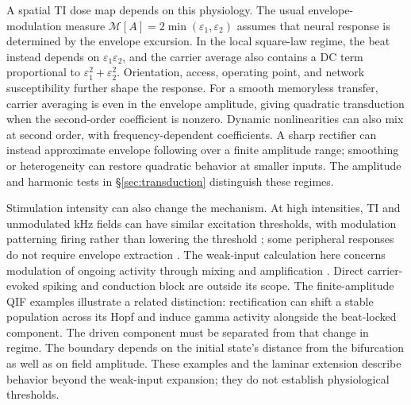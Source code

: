 \documentclass[11pt,a4paper]{article}
\providecommand{\DIFaddend}{} %
\begin{document}
\DIFaddend A spatial TI dose map depends on this physiology. The usual envelope-modulation
measure $\mathcal M[A]=2\min(\varepsilon_1,\varepsilon_2)$ assumes that neural
response is determined by the envelope excursion. In the local square-law regime,
the beat instead depends on $\varepsilon_1\varepsilon_2$, and the carrier average
also contains a DC term proportional to $\varepsilon_1^2+\varepsilon_2^2$.
Orientation, access, operating point, and network susceptibility further shape
the response. For a smooth memoryless transfer, carrier averaging is even in the
envelope amplitude, giving quadratic transduction when the second-order coefficient
is nonzero. Dynamic nonlinearities can also mix at second order, with
frequency-dependent coefficients. A sharp rectifier can instead approximate
envelope following over a finite amplitude range; smoothing or heterogeneity
can restore quadratic behavior at smaller inputs. The amplitude and harmonic
tests in \S\ref{sec:transduction} distinguish these regimes.

Stimulation intensity can also change the mechanism. At high intensities, TI and
unmodulated kHz fields can have similar excitation thresholds, with modulation
patterning firing rather than lowering the threshold
\cite{opancar2025,semenov2025}; some peripheral responses do not require envelope
extraction \cite{peripheral2023}. The weak-input calculation here concerns
modulation of ongoing activity through mixing and amplification
\cite{vieira2024,missey2026}. Direct carrier-evoked spiking and conduction block
are outside its scope. The finite-amplitude QIF examples illustrate a related
distinction: rectification can shift a stable population across its Hopf and induce
gamma activity alongside the beat-locked component. The driven component must be
separated from that change in regime. The boundary depends on the initial state's
distance from the bifurcation as well as on field amplitude. These examples and the laminar extension describe
behavior beyond the weak-input expansion; they do not establish physiological thresholds.
\end{document}
